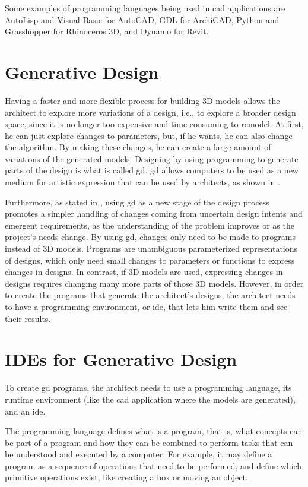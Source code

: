 Some examples of programming languages being used in \gls{cad} applications are AutoLisp and Visual Basic for AutoCAD, GDL\cite{watson2009gdl} for ArchiCAD, Python and Grasshopper for Rhinoceros 3D, and Dynamo for Revit.



\section{Generative Design}
Having a faster and more flexible process for building 3D models allows the architect to explore more variations of a design, i.e., to explore a broader design space, since it is no longer too expensive and time consuming to remodel.
At first, he can just explore changes to parameters, but, if he wants, he can also change the algorithm.
By making these changes, he can create a large amount of variations of the generated models.
Designing by using programming to generate parts of the design is what is called \gls{gd}.
\gls{gd} allows computers to be used as a new medium for artistic expression\cite{Maeda:2001:DN:559503} that can be used by architects, as shown in \cite{terzidis2003expressive}.

Furthermore, as stated in \cite{leitao2014pushing}, using \gls{gd} as a new stage of the design process promotes a simpler handling of changes coming from uncertain design intents and emergent requirements, as the understanding of the problem improves or as the project's needs change.
By using \gls{gd}, changes only need to be made to programs instead of 3D models.
Programs are unambiguous parameterized representations of designs, which only need small changes to parameters or functions to express changes in designs.
In contrast, if 3D models are used, expressing changes in designs requires changing many more parts of those 3D models.
However, in order to create the programs that generate the architect's designs, the architect needs to have a programming environment, or \gls{ide}, that lets him write them and see their results.


\section{IDEs for Generative Design}
To create \gls{gd} programs, the architect needs to use a programming language, its runtime environment (like the \gls{cad} application where the models are generated), and an \gls{ide}.

The programming language defines what is a program, that is, what concepts can be part of a program and how they can be combined to perform tasks that can be understood and executed by a computer.
For example, it may define a program as a sequence of operations that need to be performed, and define which primitive operations exist, like creating a box or moving an object.

